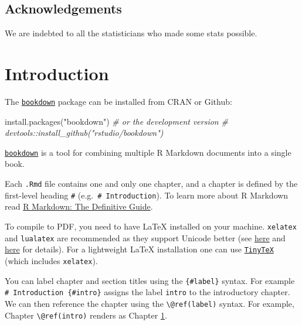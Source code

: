 \documentclass[
  british,
  oneside]{krantz}
\newenvironment{Shaded}{\begin{snugshade}}{\end{snugshade}}
\newcommand{\CommentTok}[1]{\textcolor[rgb]{0.56,0.35,0.01}{\textit{#1}}}
\newcommand{\FunctionTok}[1]{\textcolor[rgb]{0.00,0.00,0.00}{#1}}
\newcommand{\NormalTok}[1]{#1}
\newcommand{\StringTok}[1]{\textcolor[rgb]{0.31,0.60,0.02}{#1}}
\theoremstyle{definition}
\theoremstyle{definition}
\theoremstyle{definition}
\theoremstyle{definition}
\theoremstyle{remark}
\begin{document}
\hypertarget{acknowledgements}{%
\section*{Acknowledgements}\label{acknowledgements}}


We are indebted to all the statisticians who made some stats possible.

\hypertarget{intro}{%
\chapter{Introduction}\label{intro}}

The \href{https://bookdown.org/yihui/bookdown/}{\texttt{bookdown}} package can be installed from CRAN or Github:

\begin{Shaded}
\begin{Highlighting}[]
\FunctionTok{install.packages}\NormalTok{(}\StringTok{"bookdown"}\NormalTok{)}
\CommentTok{\# or the development version}
\CommentTok{\# devtools::install\_github("rstudio/bookdown")}
\end{Highlighting}
\end{Shaded}

\href{https://bookdown.org/yihui/bookdown/}{\texttt{bookdown}} is a tool for combining multiple R Markdown documents into a single book.

Each \texttt{.Rmd} file contains one and only one chapter, and a chapter is defined by the first-level heading \texttt{\#} (e.g.~\texttt{\#\ Introduction}).
To learn more about R Markdown read \href{https://bookdown.org/yihui/rmarkdown/}{R Markdown: The Definitive Guide}.

To compile to PDF, you need to have LaTeX installed on your machine. \texttt{xelatex} and \texttt{lualatex} are recommended as they support Unicode better
(see \href{https://tex.stackexchange.com/questions/3393/what-is-xetex-exactly-and-why-should-i-use-it}{here} and \href{https://tex.stackexchange.com/questions/36/differences-between-luatex-context-and-xetex}{here} for details).
For a lightweight LaTeX installation one can use \href{https://yihui.org/tinytex/}{\texttt{TinyTeX}} (which includes \texttt{xelatex}).

You can label chapter and section titles using the \texttt{\{\#label\}} syntax. For example \texttt{\#\ Introduction\ \{\#intro\}} assigns the label \texttt{intro} to the introductory chapter.
We can then reference the chapter using the \texttt{\textbackslash{}@ref(label)} syntax. For example, Chapter \texttt{\textbackslash{}@ref(intro)} renders as Chapter \ref{intro}.
\end{document}
